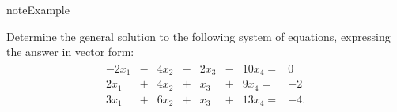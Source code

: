 \documentclass[letterpaper,10pt,english]{jupyterBook}
\begin{document}
\begin{sphinxadmonition}{note}{Example}

\sphinxAtStartPar
Determine the general solution to the following system of equations, expressing the answer in vector form:
\begin{equation*}
\begin{split}
\begin{alignat*}{5}
-2x_1 & {}-{} & 4x_2 & {}-{} & 2x_3 & {}-{} & 10x_4 {}={} & 0\\
2x_1 & {}+{} & 4x_2 & {}+{} & x_3 & {}+{} & 9x_4 {}={} & -2\\
3x_1 & {}+{} & 6x_2 & {}+{} & x_3 & {}+{} & 13x_4 {}={} & -4.
\end{alignat*}\end{split}
\end{equation*}
\sphinxAtStartPar
{}


\end{sphinxadmonition}
\end{document}
